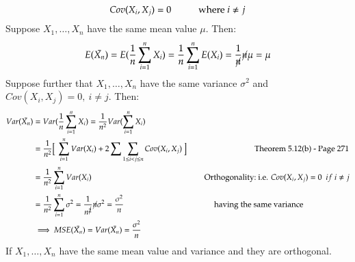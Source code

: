 \documentclass[14pt,twoside,a4paper,fleqn]{article}
\theoremstyle{plain}
\begin{document}
$$Cov(X_i,X_j) = 0\hspace*{1cm} \text{where}\ i\neq j$$
Suppose $X_1,\ldots,X_n$ have the same mean value $\mu$. Then:
$$E(\bar{X_n}) = E(\frac{1}{n}\sum_{i=1}^n X_i) = \frac{1}{n}\sum_{i=1}^n E(X_i) = \frac{1}{\cancel{n}}\cancel{n}\mu=\mu$$
Suppose further that $ X_1,\ldots ,X_n$ have the same variance $\sigma^2$ and \mbox{$Cov(X_i,X_j) = 0,\ i\neq j$}. Then:
\begin{equation*}
\begin{split}
Var(\bar{X_n}) &= Var(\frac{1}{n}\sum_{i=1}^n X_i) = \frac{1}{n^2} Var(\sum_{i=1}^n X_i)\\
	&= \frac{1}{n^2}\Big[\ \sum_{i=1}^nVar(X_i) + 2\sum\sum_{1\leq i < j \leq n} Cov(X_i, X_j)\ \Big]\tab[3cm] \text{Theorem 5.12(b) - Page 271}\\
	&= \frac{1}{n^2}\sum_{i=1}^n Var(X_i)\tab[5cm] \text{Orthogonality:\ i.e. $Cov(X_i,X_j) = 0\ \ if\ i\neq j$}\\
	&=\frac{1}{n^2}\sum_{i=1}^n \sigma^2 = \frac{1}{n^{\cancel{2}}}\cancel{n}\sigma^2 = \frac{\sigma^2}{n} \tab[4cm] \text{having the same variance}\\
	&\implies MSE(\bar{X_n}) = Var(\bar{X_n}) = \frac{\sigma^2}{n}
\end{split}
\end{equation*}
If $X_1,\ldots,X_n$ have the same mean value and variance and they are orthogonal.
\end{document}
